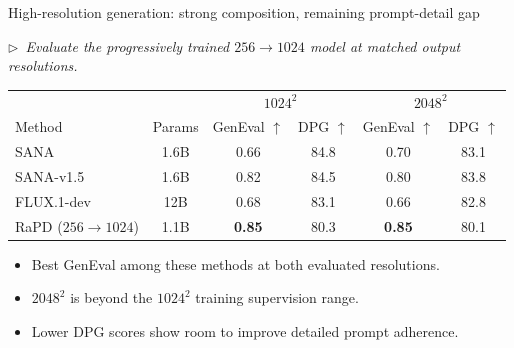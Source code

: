 \documentclass[aspectratio=169,10pt]{beamer}
\newcommand{\story}[1]{%
  {\color{rapdgray}\itshape\footnotesize $\triangleright$~#1\par}\vspace{0.3em}}
\begin{document}
\begin{frame}{High-resolution generation: strong composition, remaining prompt-detail gap}
  \story{Evaluate the progressively trained $256\rightarrow1024$ model at matched output resolutions.}
  \begin{center}
  \small
  \begin{tabular}{lccccc}
  \toprule
  & & \multicolumn{2}{c}{$1024^2$} & \multicolumn{2}{c}{$2048^2$} \\
  Method & Params & GenEval $\uparrow$ & DPG $\uparrow$ & GenEval $\uparrow$ & DPG $\uparrow$ \\
  \midrule
  SANA & 1.6B & 0.66 & 84.8 & 0.70 & 83.1 \\
  SANA-v1.5 & 1.6B & 0.82 & 84.5 & 0.80 & 83.8 \\
  FLUX.1-dev & 12B & 0.68 & 83.1 & 0.66 & 82.8 \\
  \rowcolor{lightbluepurple}
  RaPD ($256\rightarrow1024$) & 1.1B & \textbf{0.85} & 80.3 & \textbf{0.85} & 80.1 \\
  \bottomrule
  \end{tabular}
  \end{center}
  \begin{itemize}
    \item Best GenEval among these methods at both evaluated resolutions.
    \item $2048^2$ is beyond the $1024^2$ training supervision range.
    \item Lower DPG scores show room to improve detailed prompt adherence.
  \end{itemize}
\end{frame}
\end{document}
